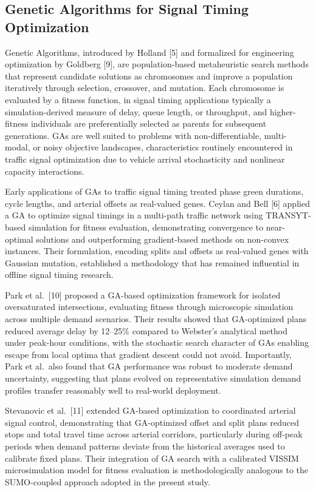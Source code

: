 \documentclass[a4paper,10pt]{article}
\begin{document}
	\subsection{Genetic Algorithms for Signal Timing Optimization}
	
	Genetic Algorithms, introduced by Holland [5] and formalized for engineering optimization by Goldberg [9], are population-based metaheuristic search methods that represent candidate solutions as chromosomes and improve a population iteratively through selection, crossover, and mutation. Each chromosome is evaluated by a fitness function, in signal timing applications typically a simulation-derived measure of delay, queue length, or throughput, and higher-fitness individuals are preferentially selected as parents for subsequent generations. GAs are well suited to problems with non-differentiable, multi-modal, or noisy objective landscapes, characteristics routinely encountered in traffic signal optimization due to vehicle arrival stochasticity and nonlinear capacity interactions.
	
	Early applications of GAs to traffic signal timing treated phase green durations, cycle lengths, and arterial offsets as real-valued genes. Ceylan and Bell [6] applied a GA to optimize signal timings in a multi-path traffic network using TRANSYT-based simulation for fitness evaluation, demonstrating convergence to near-optimal solutions and outperforming gradient-based methods on non-convex instances. Their formulation, encoding splits and offsets as real-valued genes with Gaussian mutation, established a methodology that has remained influential in offline signal timing research.
	
	Park et al.~[10] proposed a GA-based optimization framework for isolated oversaturated intersections, evaluating fitness through microscopic simulation across multiple demand scenarios. Their results showed that GA-optimized plans reduced average delay by 12--25\% compared to Webster's analytical method under peak-hour conditions, with the stochastic search character of GAs enabling escape from local optima that gradient descent could not avoid. Importantly, Park et al.~also found that GA performance was robust to moderate demand uncertainty, suggesting that plans evolved on representative simulation demand profiles transfer reasonably well to real-world deployment.
	
	Stevanovic et al.~[11] extended GA-based optimization to coordinated arterial signal control, demonstrating that GA-optimized offset and split plans reduced stops and total travel time across arterial corridors, particularly during off-peak periods when demand patterns deviate from the historical averages used to calibrate fixed plans. Their integration of GA search with a calibrated VISSIM microsimulation model for fitness evaluation is methodologically analogous to the SUMO-coupled approach adopted in the present study.
	
\end{document}
